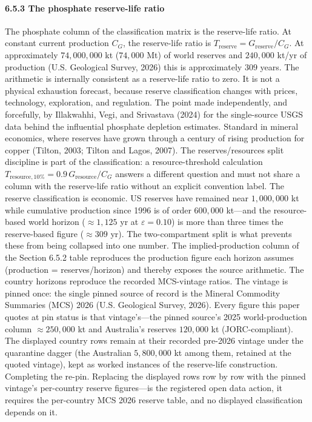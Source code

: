 \documentclass[11pt]{article}
\begin{document}
\paragraph{6.5.3 The phosphate reserve-life
ratio}\label{the-phosphate-reserve-life-ratio}

The phosphate column of the classification matrix is the reserve-life ratio. At constant current production \(C_G\), the reserve-life ratio is \(T_{\mathrm{reserve}} = G_{\mathrm{reserve}}/C_G\). At approximately \(74{,}000{,}000\) kt (\(74{,}000\) Mt) of world reserves and \(240{,}000\) kt/\allowbreak{}yr of production (U.S. Geological Survey, 2026) this is approximately \(309\) years. The arithmetic is internally consistent as a reserve-life ratio to zero. It is not a physical exhaustion forecast, because reserve classification changes with prices, technology, exploration, and regulation. The point made independently, and forcefully, by Illakwahhi, Vegi, and Srivastava (2024) for the single-source USGS data behind the influential phosphate depletion estimates. Standard in mineral economics, where reserves have grown through a century of rising production for copper (Tilton, 2003; Tilton and Lagos, 2007). The reserves/\allowbreak{}resources split discipline is part of the classification: a resource-threshold calculation \(T_{\mathrm{resource},10\%} = 0.9\, G_{\mathrm{resource}}/C_G\) answers a different question and must not share a column with the reserve-life ratio without an explicit convention label. The reserve classification is economic. US reserves have remained near \(1{,}000{,}000\) kt while cumulative production since 1996 is of order \(600{,}000\) kt---and the resource-based world horizon (\(\approx 1{,}125\) yr at \(\varepsilon = 0.10\)) is more than three times the reserve-based figure (\(\approx 309\) yr). The two-compartment split is what prevents these from being collapsed into one number. The implied-production column of the Section 6.5.2 table reproduces the production figure each horizon assumes (production = reserves/\allowbreak{}horizon) and thereby exposes the source arithmetic. The country horizons reproduce the recorded MCS-vintage ratios. The vintage is pinned once: the single pinned source of record is the Mineral Commodity Summaries (MCS) 2026 (U.S. Geological Survey, 2026). Every figure this paper quotes at pin status is that vintage's---the pinned source's 2025 world-production column \(\approx 250{,}000\) kt and Australia's reserves \(120{,}000\) kt (JORC-compliant). The displayed country rows remain at their recorded pre-2026 vintage under the quarantine dagger (the Australian \(5{,}800{,}000\) kt among them, retained at the quoted vintage), kept as worked instances of the reserve-life construction. Completing the re-pin. Replacing the displayed rows row by row with the pinned vintage's per-country reserve figures---is the registered open data action, it requires the per-country MCS 2026 reserve table, and no displayed classification depends on it.
\end{document}
